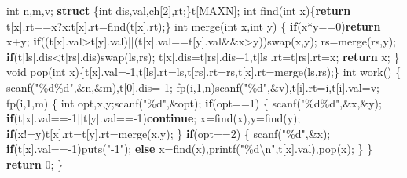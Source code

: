 \documentclass[
]{article}
\newenvironment{Shaded}{}{}
\newcommand{\ControlFlowTok}[1]{\textcolor[rgb]{0.00,0.44,0.13}{\textbf{#1}}}
\newcommand{\DataTypeTok}[1]{\textcolor[rgb]{0.56,0.13,0.00}{#1}}
\newcommand{\DecValTok}[1]{\textcolor[rgb]{0.25,0.63,0.44}{#1}}
\newcommand{\KeywordTok}[1]{\textcolor[rgb]{0.00,0.44,0.13}{\textbf{#1}}}
\newcommand{\NormalTok}[1]{#1}
\newcommand{\SpecialCharTok}[1]{\textcolor[rgb]{0.25,0.44,0.63}{#1}}
\newcommand{\StringTok}[1]{\textcolor[rgb]{0.25,0.44,0.63}{#1}}
\begin{document}
\begin{Shaded}
\begin{Highlighting}[]
\DataTypeTok{int}\NormalTok{ n,m,v;}
\KeywordTok{struct}\NormalTok{ \{}\DataTypeTok{int}\NormalTok{ dis,val,ch[}\DecValTok{2}\NormalTok{],rt;\}t[MAXN];}
\DataTypeTok{int}\NormalTok{ find(}\DataTypeTok{int}\NormalTok{ x)\{}\ControlFlowTok{return}\NormalTok{ t[x].rt==x?x:t[x].rt=find(t[x].rt);\}}
\DataTypeTok{int}\NormalTok{ merge(}\DataTypeTok{int}\NormalTok{ x,}\DataTypeTok{int}\NormalTok{ y)}
\NormalTok{\{}
    \ControlFlowTok{if}\NormalTok{(x*y==}\DecValTok{0}\NormalTok{)}\ControlFlowTok{return}\NormalTok{ x+y;}
    \ControlFlowTok{if}\NormalTok{((t[x].val\textgreater{}t[y].val)||(t[x].val==t[y].val\&\&x\textgreater{}y))swap(x,y);}
\NormalTok{    rs=merge(rs,y);}
    \ControlFlowTok{if}\NormalTok{(t[ls].dis\textless{}t[rs].dis)swap(ls,rs);}
\NormalTok{    t[x].dis=t[rs].dis+}\DecValTok{1}\NormalTok{,t[ls].rt=t[rs].rt=x;}
    \ControlFlowTok{return}\NormalTok{ x;}
\NormalTok{\}}
\DataTypeTok{void}\NormalTok{ pop(}\DataTypeTok{int}\NormalTok{ x)\{t[x].val={-}}\DecValTok{1}\NormalTok{,t[ls].rt=ls,t[rs].rt=rs,t[x].rt=merge(ls,rs);\}}
\DataTypeTok{int}\NormalTok{ work()}
\NormalTok{\{}
\NormalTok{    scanf(}\StringTok{"}\SpecialCharTok{\%d\%d}\StringTok{"}\NormalTok{,\&n,\&m),t[}\DecValTok{0}\NormalTok{].dis={-}}\DecValTok{1}\NormalTok{;}
\NormalTok{    fp(i,}\DecValTok{1}\NormalTok{,n)scanf(}\StringTok{"}\SpecialCharTok{\%d}\StringTok{"}\NormalTok{,\&v),t[i].rt=i,t[i].val=v;}
\NormalTok{    fp(i,}\DecValTok{1}\NormalTok{,m)}
\NormalTok{    \{}
        \DataTypeTok{int}\NormalTok{ opt,x,y;scanf(}\StringTok{"}\SpecialCharTok{\%d}\StringTok{"}\NormalTok{,\&opt);}
        \ControlFlowTok{if}\NormalTok{(opt==}\DecValTok{1}\NormalTok{)}
\NormalTok{        \{}
\NormalTok{            scanf(}\StringTok{"}\SpecialCharTok{\%d\%d}\StringTok{"}\NormalTok{,\&x,\&y);}
            \ControlFlowTok{if}\NormalTok{(t[x].val=={-}}\DecValTok{1}\NormalTok{||t[y].val=={-}}\DecValTok{1}\NormalTok{)}\ControlFlowTok{continue}\NormalTok{;}
\NormalTok{            x=find(x),y=find(y);}
            \ControlFlowTok{if}\NormalTok{(x!=y)t[x].rt=t[y].rt=merge(x,y);}
\NormalTok{        \}}
        \ControlFlowTok{if}\NormalTok{(opt==}\DecValTok{2}\NormalTok{)}
\NormalTok{        \{}
\NormalTok{            scanf(}\StringTok{"}\SpecialCharTok{\%d}\StringTok{"}\NormalTok{,\&x);}
            \ControlFlowTok{if}\NormalTok{(t[x].val=={-}}\DecValTok{1}\NormalTok{)puts(}\StringTok{"{-}1"}\NormalTok{);}
            \ControlFlowTok{else}\NormalTok{ x=find(x),printf(}\StringTok{"}\SpecialCharTok{\%d\textbackslash{}n}\StringTok{"}\NormalTok{,t[x].val),pop(x);}
\NormalTok{        \}}
\NormalTok{    \}}
    \ControlFlowTok{return} \DecValTok{0}\NormalTok{;}
\NormalTok{\}}
\end{Highlighting}
\end{Shaded}
\end{document}
